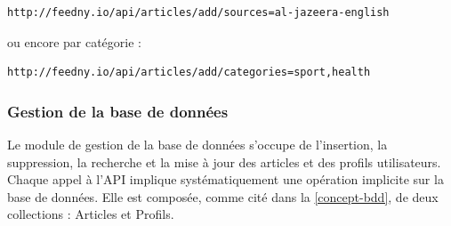 \begin{lstlisting}[style=api] 
   http://feedny.io/api/articles/add/sources=al-jazeera-english
\end{lstlisting}

ou encore par catégorie :
\begin{lstlisting}[style=api] 
   http://feedny.io/api/articles/add/categories=sport,health
\end{lstlisting}  

\subsubsection{Gestion de la base de données}
Le module de gestion de la base de données s'occupe de l'insertion, la suppression, la recherche et la mise à jour des articles et des profils utilisateurs. Chaque appel à l'API implique systématiquement une opération implicite sur la base de données. Elle est composée, comme cité dans la \autoref{concept-bdd}, de deux collections : Articles et Profils. 

